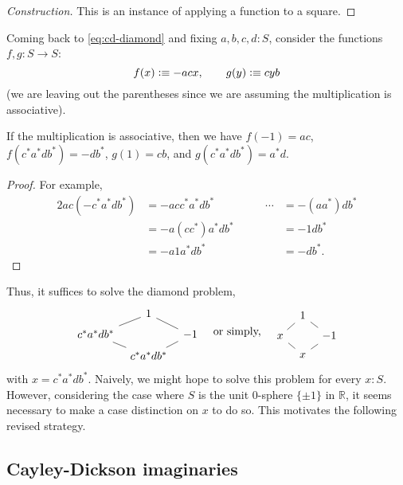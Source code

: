 \begin{proof}[Construction]
  This is an instance of applying a function to a square.
\end{proof}
Coming back to \eqref{eq:cd-diamond} and fixing $a,b,c,d:S$, consider
the functions $f,g: S \to S$:
\begin{equation*}
  f(x) \vcentcolon\equiv -acx, \qquad g(y) \vcentcolon\equiv cyb
\end{equation*}
(we are leaving out the parentheses since we are assuming the
multiplication is associative).
\begin{lem}\label{lem:calculations}
  If the multiplication is associative, then we have $f(-1)=ac$,
  $f(c^*a^*db^*)=-db^*$, $g(1)=cb$, and $g(c^*a^*db^*)=a^*d$.
\end{lem}
\begin{proof}
  For example,
  \begin{alignat*}2
    ac(-c^*a^*db^*)
    &= -acc^*a^*db^* & \qquad\cdots
    &= -(aa^*)db^* \\
    &= -a(cc^*)a^*db^* &
    &= -1db^* \\
    &= -a1a^*db^* &
    &= -db^*.
  \end{alignat*}
  \par \vspace{-1.3\baselineskip}
  \qedhere
\end{proof}
Thus, it suffices to solve the diamond problem,
\begin{equation}\label{eq:x-diamond}
  \begin{tikzcd}[every arrow/.append style={-},row sep=tiny,column sep=tiny]
    & 1 \arrow{dl}\arrow{dr} & \\
    c^*a^*db^* \arrow{dr} & & -1\arrow{dl} \\
    & c^*a^*db^* &
  \end{tikzcd}\quad\text{or simply,}\quad
  \begin{tikzcd}[every arrow/.append style={-},row sep=tiny,column sep=tiny]
    & 1 \arrow{dl}\arrow{dr} & \\
    x \arrow{dr} & & -1\arrow{dl} \\
    & x &
  \end{tikzcd}
\end{equation}
with $x=c^*a^*db^*$. Naively, we might hope to solve this problem for every
$x:S$. However, considering the case where $S$ is the unit $0$-sphere
$\{\pm1\}$ in $\mathbb R$, it seems necessary to make a case
distinction on $x$ to do so. This motivates the following revised
strategy.

\subsection{Cayley-Dickson imaginaries}

